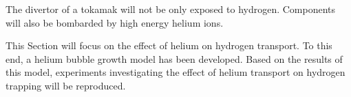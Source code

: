 The \gls{divertor} of a \gls{tokamak} will not be only exposed to hydrogen.
Components will also be bombarded by high energy helium ions.

This Section will focus on the effect of helium on hydrogen transport.
To this end, a helium bubble growth model has been developed.
Based on the results of this model, experiments investigating the effect of helium transport on hydrogen trapping will be reproduced.
